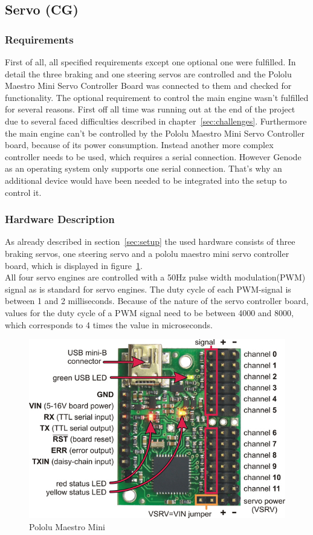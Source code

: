\subsection{Servo (CG)}
\label{sec:servo}

\subsubsection{Requirements}
First of all, all specified requirements except one optional one were fulfilled. In detail the three braking and one steering servos are controlled and the Pololu Maestro Mini Servo Controller Board was connected to them and checked for functionality. The optional requirement to control the main engine wasn't fulfilled for several reasons. First off all time was running out at the end of the project due to several faced difficulties described in chapter~\ref{sec:challenges}. Furthermore the main engine can't be controlled by the Pololu Maestro Mini Servo Controller board, because of its power consumption. Instead another more complex controller needs to be used, which requires a serial connection. However Genode as an operating system only supports one serial connection. That's why an additional device would have been needed to be integrated into the setup to control it.

\subsubsection{Hardware Description}
As already described in section~\ref{sec:setup} the used hardware consists of three braking servos, one steering servo and a pololu maestro mini servo controller board, which is displayed in figure~\ref{fig:pololu}.\\

All four servo engines are controlled with a 50Hz pulse width modulation(PWM) signal as is standard for servo engines. The duty cycle of each PWM-signal is between 1 and 2 milliseconds. Because of the nature of the servo controller board, values for the duty cycle of a PWM signal need to be between 4000 and 8000, which corresponds to 4 times the value in microseconds.\\

\begin{figure}[h!tb]
	\centering
    \includegraphics[width=0.7\linewidth]{images/pololu}
    \caption{Pololu Maestro Mini}
    \label{fig:pololu}
\end{figure}

